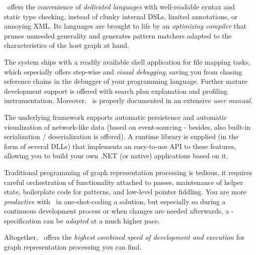 \GrG\ offers the convenience of \emph{dedicated languages} with well-readable syntax and static type checking, instead of clunky internal DSLs, limited annotations, or annoying XML.
Its languages are brought to life by an \emph{optimizing compiler} that prunes unneeded generality and generates pattern matchers adapted to the characteristics of the host graph at hand.

The system ships with a readily available shell application for file mapping tasks, which especially offers step-wise and \emph{visual debugging}, saving you from chasing reference chains in the debugger of your programming language.
Further mature development support is offered with search plan explanation and profiling instrumentation. 
Moreover, \GrG\ is properly documented in an extensive \emph{user manual}.

The underlying framework supports automatic persistence and automatic visualization of network-like data (based on event-sourcing - besides, also built-in serialization / deserialization is offered).
A runtime library is supplied (in the form of several DLLs) that implements an easy-to-use API to these features, allowing you to build your own .NET (or native) applications based on it.

Traditional programming of graph representation processing is tedious, it requires careful orchestration of functionality attached to passes, maintenance of helper state, boilerplate code for patterns, and low-level pointer fiddling.
You are more \emph{productive} with \GrG\ in one-shot-coding a solution, but especially so during a continuous development process or when changes are needed afterwards, a \GrG-specification can be \emph{adapted} at a much higher pace.

Altogether, \GrG\ offers the \emph{highest combined speed of development and execution} for graph representation processing you can find.


